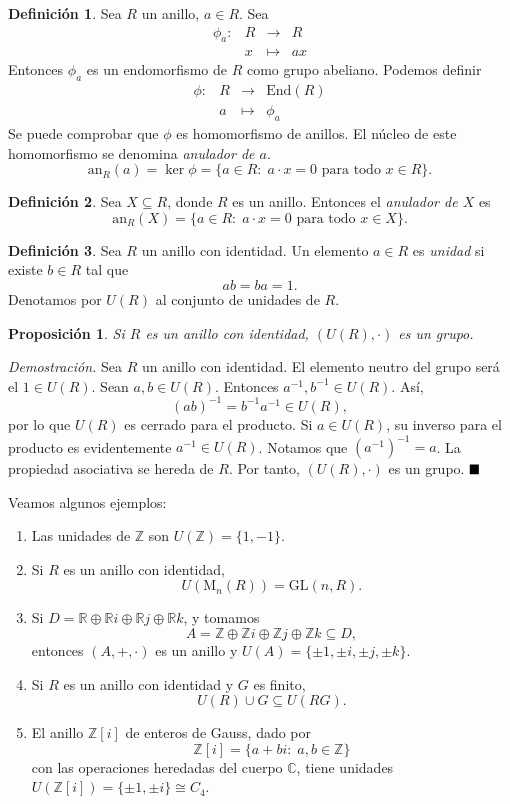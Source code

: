 \documentclass[11pt]{book}
\def\R{\mathbb{R}}
\def\Z{\mathbb{Z}}
\def\C{\mathbb{C}}
\def\End{\mathrm{End}}
\def\GL{\mathrm{GL}}
\def\qed{\hfill\blacksquare}
\newtheorem{prop}[theorem]{Proposición}
\theoremstyle{definition}
\newtheorem{definition}{Definición}[section]
\begin{document}
\begin{definition}
    Sea $R$ un anillo, $a\in R$. Sea \[
    \begin{array}{rlcl}
        \phi_a: & R & \longrightarrow & R\\
        & x & \longmapsto & ax
    \end{array}
    \]Entonces $\phi_a$ es un endomorfismo de $R$ como grupo abeliano. Podemos definir\[
    \begin{array}{rlcl} 
        \phi:&R&\longrightarrow &\End(R)\\
        &a&\longmapsto &\phi_a  
    \end{array}
    \]Se puede comprobar que $\phi$ es homomorfismo de anillos. El núcleo de este homomorfismo se denomina \textit{anulador de $a$}.\[
    \textrm{an}_R(a)=\ker\phi=\{a\in R:\; a\cdot x=0\text{ para todo }x\in R\}.
    \]
\end{definition}

\begin{definition}
    Sea $X\subseteq R$, donde $R$ es un anillo. Entonces el \textit{anulador de $X$} es\[
        \textrm{an}_R(X)=\{a\in R:\; a\cdot x=0\text{ para todo }x\in X\}.
    \]
\end{definition}

\begin{definition}
    Sea $R$ un anillo con identidad. Un elemento $a\in R$ es \textit{unidad} si existe $b\in R$ tal que\[
        ab=ba=1.
        \]Denotamos por $U(R)$ al conjunto de unidades de $R$.
\end{definition}

\begin{prop}
    Si $R$ es un anillo con identidad, $(U(R),\cdot)$ es un grupo.
\end{prop}
\noindent\textit{Demostración.} Sea $R$ un anillo con identidad. El elemento neutro del grupo será el $1\in U(R)$. Sean $a,b\in U(R)$. Entonces $a^{-1},b^{-1}\in U(R)$. Así,\[(ab)^{-1}=b^{-1}a^{-1}\in U(R),\]por lo que $U(R)$ es cerrado para el producto. Si $a\in U(R)$, su inverso para el producto es evidentemente $a^{-1}\in U(R)$. Notamos que $(a^{-1})^{-1}=a$. La propiedad asociativa se hereda de $R$. Por tanto, $(U(R),\cdot)$ es un grupo. $\qed$

Veamos algunos ejemplos:\begin{enumerate}
    \item Las unidades de $\Z$ son $U(\Z)=\{1,-1\}$.
    \item Si $R$ es un anillo con identidad,\[
    U(\mathrm{M}_n(R))=\GL(n,R).
    \]
    \item Si $D=\R\oplus \R i\oplus \R j\oplus \R k$, y tomamos\[
    A=\Z \oplus\Z i\oplus\Z j\oplus\Z k\subseteq D,
    \]entonces $(A,+,\cdot)$ es un anillo y $U(A)=\{\pm1,\pm i,\pm j,\pm k\}$.
    \item Si $R$ es un anillo con identidad y $G$ es finito,\[
    U(R)\cup G\subseteq U(RG).
    \]
    \item El anillo $\Z[i]$ de enteros de Gauss, dado por\[
    \Z[i]=\{a+bi:\; a,b\in\Z\}
    \]con las operaciones heredadas del cuerpo $\C$, tiene unidades $U(\Z[i])=\{\pm 1,\pm i\}\cong C_4$.
\end{enumerate}
\end{document}
